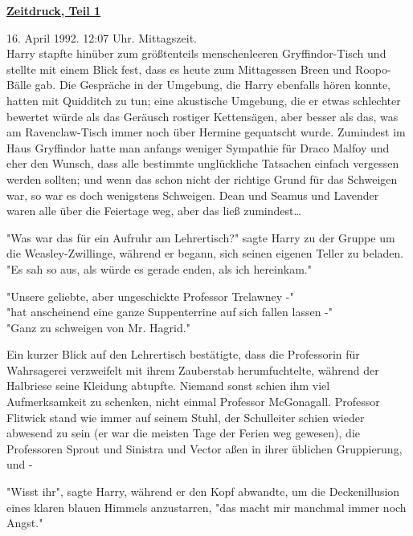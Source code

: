 

\hypertarget{zeitdruck-teil-1}{%

\textbf{\uline{Zeitdruck, Teil 1}}

16. April 1992. 12:07 Uhr. Mittagszeit.\\ Harry stapfte hinüber zum größtenteils menschenleeren Gryffindor-Tisch und stellte mit einem Blick fest, dass es heute zum Mittagessen Breen und Roopo-Bälle gab. Die Gespräche in der Umgebung, die Harry ebenfalls hören konnte, hatten mit Quidditch zu tun; eine akustische Umgebung, die er etwas schlechter bewertet würde als das Geräusch rostiger Kettensägen, aber besser als das, was am Ravenclaw-Tisch immer noch über Hermine gequatscht wurde. Zumindest im Haus Gryffindor hatte man anfangs weniger Sympathie für Draco Malfoy und eher den Wunsch, dass alle bestimmte unglückliche Tatsachen einfach vergessen werden sollten; und wenn das schon nicht der richtige Grund für das Schweigen war, so war es doch wenigstens Schweigen. Dean und Seamus und Lavender waren alle über die Feiertage weg, aber das ließ zumindest…

"Was war das für ein Aufruhr am Lehrertisch?" sagte Harry zu der Gruppe um die Weasley-Zwillinge, während er begann, sich seinen eigenen Teller zu beladen. "Es sah so aus, als würde es gerade enden, als ich hereinkam."

"Unsere geliebte, aber ungeschickte Professor Trelawney -"\\ "hat anscheinend eine ganze Suppenterrine auf sich fallen lassen -"\\ "Ganz zu schweigen von Mr. Hagrid."

Ein kurzer Blick auf den Lehrertisch bestätigte, dass die Professorin für Wahrsagerei verzweifelt mit ihrem Zauberstab herumfuchtelte, während der Halbriese seine Kleidung abtupfte. Niemand sonst schien ihm viel Aufmerksamkeit zu schenken, nicht einmal Professor McGonagall. Professor Flitwick stand wie immer auf seinem Stuhl, der Schulleiter schien wieder abwesend zu sein (er war die meisten Tage der Ferien weg gewesen), die Professoren Sprout und Sinistra und Vector aßen in ihrer üblichen Gruppierung, und -

"Wisst ihr", sagte Harry, während er den Kopf abwandte, um die Deckenillusion eines klaren blauen Himmels anzustarren, "das macht mir manchmal immer noch Angst."

}
